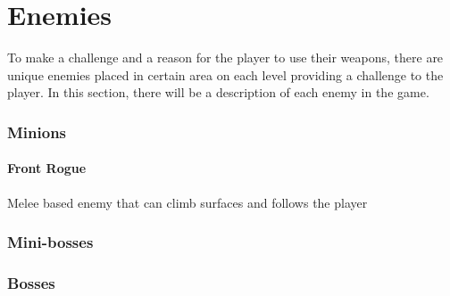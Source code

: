 \documentclass[../Main.tex]{subfiles}
\begin{document}
\section{Enemies}

To make a challenge and a reason for the player to use their weapons, there are unique enemies placed in certain area on each level providing a challenge to the player. In this section, there will be a description of each enemy in the game.

\subsubsection{Minions}

\paragraph{Front Rogue}

Melee based enemy that can climb surfaces and follows the player

\subsubsection{Mini-bosses}
\subsubsection{Bosses}
\end{document}
